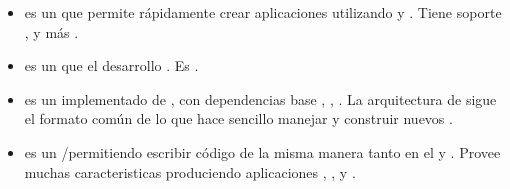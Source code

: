 \begin{itemize}
		\item
			\textbf{\saneNAME} es un \fullstackAS \javaScriptNAME que permite rápidamente crear aplicaciones \webINT \productionReadyPC utilizando \sailsNAME y \emberjsNAME. Tiene soporte \dockerNAME, \generatorsAS y más \cite{online_sanestack_official_site}.
		\item
			\textbf{\cokeNAME} es un \nodejsNAME \mvcAS \frameworkPC \lightweightPL que \speedupCPT el desarrollo \webINT. Es \modularizedAS \cite{online_cokejs_official_site}. 
		\item
			\textbf{\sleekjsNAME} es un \frameworkPC \mvcAS implementado de \nodejsNAME, \builtINPL con dependencias base \handlebarsNAMEref, \expressjsNAMEref, \mongooseNAME. La arquitectura de \sleekjsNAME sigue el formato común de \mvcAS lo que hace sencillo manejar y construir nuevos \websitesINT\cite{online_sleekjs_official_site}.
		\item
			\textbf{\danfNAME} es un \fullstackAS \javaScriptNAME/\nodejsNAME \oopPL \frameworkPC permitiendo escribir código de la misma manera tanto en el \serverSideAS y \clientSideAS. Provee muchas caracteristicas produciendo aplicaciones \scalableQA, \maintainableQA, \testeableQA y \performanceQA\cite{online_danf_official_gitHub}.

	\end{itemize}
